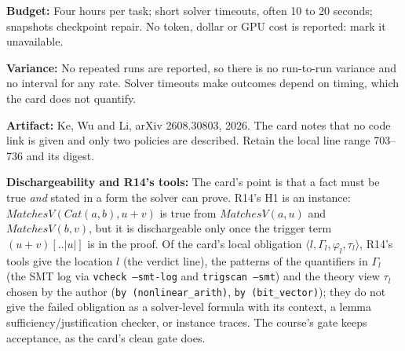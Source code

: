 \documentclass[11pt]{article}
\begin{document}
\begin{answer}
\textbf{Budget:} Four hours per task; short solver timeouts, often 10 to 20 seconds; snapshots checkpoint repair. No token, dollar or GPU cost is reported: mark it unavailable.

\textbf{Variance:} No repeated runs are reported, so there is no run-to-run variance and no interval for any rate. Solver timeouts make outcomes depend on timing, which the card does not quantify.

\textbf{Artifact:} Ke, Wu and Li, arXiv 2608.30803, 2026. The card notes that no code link is given and only two policies are described. Retain the local line range 703--736 and its digest.

\textbf{Dischargeability and R14's tools:} The card's point is that a fact must be true \emph{and} stated in a form the solver can prove. R14's H1 is an instance: $\mathit{MatchesV}(\mathit{Cat}(a, b), u + v)$ is true from $\mathit{MatchesV}(a, u)$ and $\mathit{MatchesV}(b, v)$, but it is dischargeable only once the trigger term $(u + v)[..|u|]$ is in the proof. Of the card's local obligation $\langle l, \Gamma_l, \varphi_l, \tau_l\rangle$, R14's tools give the location $l$ (the verdict line), the patterns of the quantifiers in $\Gamma_l$ (the SMT log via \texttt{vcheck --smt-log} and \texttt{trigscan --smt}) and the theory view $\tau_l$ chosen by the author (\texttt{by (nonlinear\_arith)}, \texttt{by (bit\_vector)}); they do not give the failed obligation as a solver-level formula with its context, a lemma sufficiency/justification checker, or instance traces. The course's gate keeps acceptance, as the card's clean gate does.
\end{answer}
\end{document}
